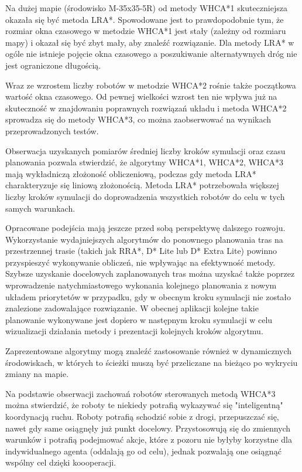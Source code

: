 Na dużej mapie (środowisko M-35x35-5R) od metody WHCA*1 skuteczniejsza okazała się być metoda LRA*. Spowodowane jest to prawdopodobnie tym, że rozmiar okna czasowego w metodzie WHCA*1 jest stały (zależny od rozmiaru mapy) i okazał się być zbyt mały, aby znaleźć rozwiązanie. Dla metody LRA* w ogóle nie istnieje pojęcie okna czasowego a poszukiwanie alternatywnych dróg nie jest ograniczone długością.

Wraz ze wzrostem liczby robotów w metodzie WHCA*2 rośnie także początkowa wartość okna czasowego.
Od pewnej wielkości wzrost ten nie wpływa już na skuteczność w znajdowaniu poprawnych rozwiązań układu i metoda WHCA*2 sprowadza się do metody WHCA*3, co można zaobserwować na wynikach przeprowadzonych testów.

Obserwacja uzyskanych pomiarów średniej liczby kroków symulacji oraz czasu planowania pozwala stwierdzić, że algorytmy WHCA*1, WHCA*2, WHCA*3 mają wykładniczą złożoność obliczeniową, podczas gdy metoda LRA* charakteryzuje się liniową złożonością.
Metoda LRA* potrzebowała większej liczby kroków symulacji do doprowadzenia wszystkich robotów do celu w tych samych warunkach.


Opracowane podejścia mają jeszcze przed sobą perspektywę dalszego rozwoju.
Wykorzystanie wydajniejszych algorytmów do ponownego planowania tras na przestrzennej trasie (takich jak RRA*, D* Lite lub D* Extra Lite) powinno przyspieszyć wykonywanie obliczeń, nie wpływając na efektywność metody.
Szybsze uzyskanie docelowych zaplanowanych tras można uzyskać także poprzez wprowadzenie natychmiastowego wykonania kolejnego planowania z nowym układem priorytetów w przypadku, gdy w obecnym kroku symulacji nie zostało znalezione zadowalające rozwiązanie.
W obecnej aplikacji kolejne takie planowanie wykonywane jest dopiero w następnym kroku symulacji w celu wizualizacji działania metody i prezentacji kolejnych kroków algorytmu.

Zaprezentowane algorytmy mogą znaleźć zastosowanie również w dynamicznych środowiskach, w których to ścieżki muszą być przeliczane na bieżąco po wykryciu zmiany na mapie.

Na podstawie obserwacji zachowań robotów sterowanych metodą WHCA*3 można stwierdzić, że roboty te niekiedy potrafią wykazywać się "inteligentną" koordynacją ruchu.
Roboty potrafią schodzić sobie z drogi, przepuszczać się, nawet gdy same osiągnęły już punkt docelowy.
Przystosowują się do zmiennych warunków i potrafią podejmować akcje, które z pozoru nie byłyby korzystne dla indywidualnego agenta (oddalają go od celu), jednak pozwalają one osiągnąć wspólny cel dzięki koooperacji.
